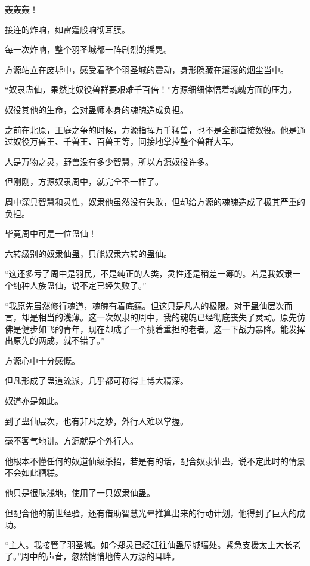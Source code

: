 
\begin{this_body}

轰轰轰！

接连的炸响，如雷霆般响彻耳膜。

每一次炸响，整个羽圣城都一阵剧烈的摇晃。

方源站立在废墟中，感受着整个羽圣城的震动，身形隐藏在滚滚的烟尘当中。

“奴隶蛊仙，果然比奴役兽群要艰难千百倍！”方源细细体悟着魂魄方面的压力。

奴役其他的生命，会对蛊师本身的魂魄造成负担。

之前在北原，王庭之争的时候，方源指挥万千猛兽，也不是全都直接奴役。他是通过奴役万兽王、千兽王、百兽王等，间接地掌控整个兽群大军。

人是万物之灵，野兽没有多少智慧，所以方源奴役许多。

但刚刚，方源奴隶周中，就完全不一样了。

周中深具智慧和灵性，奴隶他虽然没有失败，但却给方源的魂魄造成了极其严重的负担。

毕竟周中可是一位蛊仙！

六转级别的奴隶仙蛊，只能奴隶六转的蛊仙。

“这还多亏了周中是羽民，不是纯正的人类，灵性还是稍差一筹的。若是我奴隶一个纯种人族蛊仙，说不定已经失败了。”

“我原先虽然修行魂道，魂魄有着底蕴。但这只是凡人的极限。对于蛊仙层次而言，却是相当的浅薄。这一次奴隶的周中，我的魂魄已经彻底丧失了灵动。原先仿佛是健步如飞的青年，现在却成了一个挑着重担的老者。这一下战力暴降。能发挥出原先的两成，就不错了。”

方源心中十分感慨。

但凡形成了蛊道流派，几乎都可称得上博大精深。

奴道亦是如此。

到了蛊仙层次，也有非凡之妙，外行人难以掌握。

毫不客气地讲。方源就是个外行人。

他根本不懂任何的奴道仙级杀招，若是有的话，配合奴隶仙蛊，说不定此时的情景不会如此糟糕。

他只是很肤浅地，使用了一只奴隶仙蛊。

但配合他的前世经验，还有借助智慧光晕推算出来的行动计划，他得到了巨大的成功。

“主人。我接管了羽圣城。如今郑灵已经赶往仙蛊屋城墙处。紧急支援太上大长老了。”周中的声音，忽然悄悄地传入方源的耳畔。


\end{this_body}
